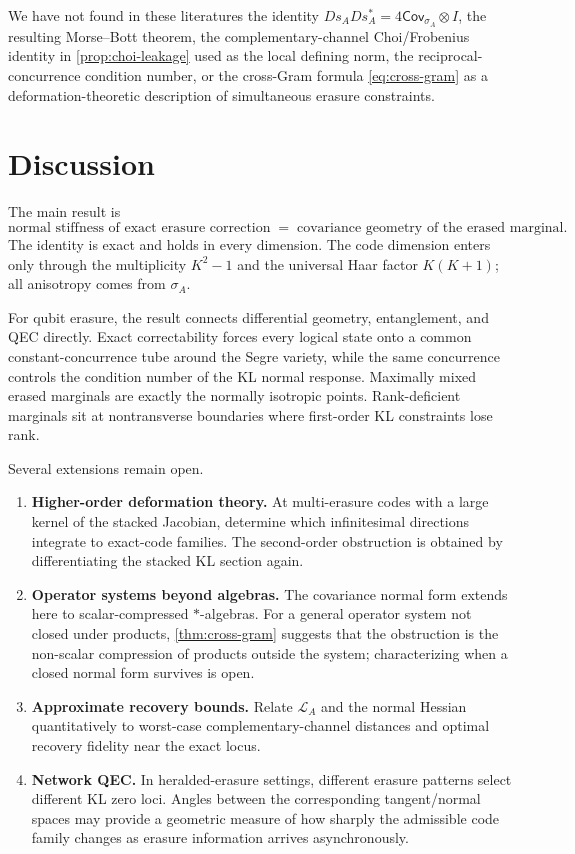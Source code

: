 \documentclass[11pt]{article}
\theoremstyle{definition}
\newcommand{\cL}{\mathcal L}
\newcommand{\1}{\mathbf 1}
\begin{document}
We have not found in these literatures the identity $Ds_A Ds_A^*=4\mathsf{Cov}_{\sigma_A}\otimes I$, the resulting Morse--Bott theorem, the complementary-channel Choi/Frobenius identity in \cref{prop:choi-leakage} used as the local defining norm, the reciprocal-concurrence condition number, or the cross-Gram formula \eqref{eq:cross-gram} as a deformation-theoretic description of simultaneous erasure constraints.

\section{Discussion}

The main result is
\[
\boxed{
\text{normal stiffness of exact erasure correction}
\;=\;
\text{covariance geometry of the erased marginal}.
}
\]
The identity is exact and holds in every dimension.  The code dimension enters only through the multiplicity $K^2-1$ and the universal Haar factor $K(K+1)$; all anisotropy comes from $\sigma_A$.

For qubit erasure, the result connects differential geometry, entanglement, and QEC directly.  Exact correctability forces every logical state onto a common constant-concurrence tube around the Segre variety, while the same concurrence controls the condition number of the KL normal response.  Maximally mixed erased marginals are exactly the normally isotropic points.  Rank-deficient marginals sit at nontransverse boundaries where first-order KL constraints lose rank.

Several extensions remain open.
\begin{enumerate}[label=(\arabic*)]
    \item \textbf{Higher-order deformation theory.}  At multi-erasure codes with a large kernel of the stacked Jacobian, determine which infinitesimal directions integrate to exact-code families.  The second-order obstruction is obtained by differentiating the stacked KL section again.
    \item \textbf{Operator systems beyond algebras.}  The covariance normal form extends here to scalar-compressed $*$-algebras.  For a general operator system not closed under products, \cref{thm:cross-gram} suggests that the obstruction is the non-scalar compression of products outside the system; characterizing when a closed normal form survives is open.
    \item \textbf{Approximate recovery bounds.}  Relate $\cL_A$ and the normal Hessian quantitatively to worst-case complementary-channel distances and optimal recovery fidelity near the exact locus.
    \item \textbf{Network QEC.}  In heralded-erasure settings, different erasure patterns select different KL zero loci.  Angles between the corresponding tangent/normal spaces may provide a geometric measure of how sharply the admissible code family changes as erasure information arrives asynchronously.
\end{enumerate}
\end{document}
